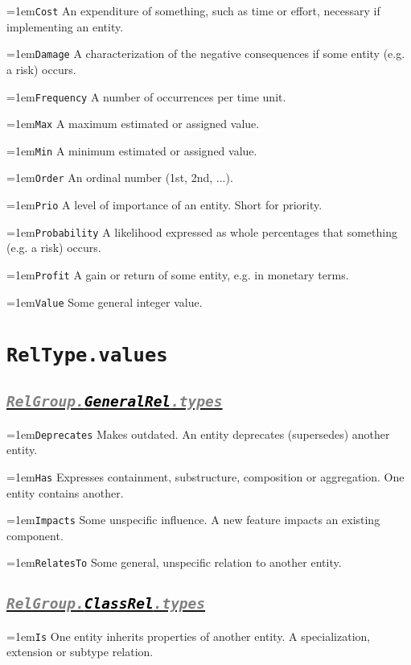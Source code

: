 \documentclass[a4paper,oneside]{article}
\newcommand\Concept[2]{\hangindent=1em\lstinline+#1+ #2}
\begin{document}
\begin{multicols*}{4}
\Concept{Cost}{An expenditure of something, such as time or effort, necessary if implementing an entity.}

\Concept{Damage}{A characterization of the negative consequences if some entity (e.g. a risk) occurs.}

\Concept{Frequency}{A number of occurrences per time unit. }

\Concept{Max}{A maximum estimated or assigned value.}

\Concept{Min}{A minimum estimated or assigned value.}

\Concept{Order}{An ordinal number (1st, 2nd, ...).}

\Concept{Prio}{A level of importance of an entity. Short for priority.}

\Concept{Probability}{A likelihood expressed as whole percentages that something (e.g. a risk) occurs.}

\Concept{Profit}{A gain or return of some entity, e.g. in monetary terms.}

\Concept{Value}{Some general integer value.}
 

\section*{\texttt{RelType.values}}

\subsection*{\underline{\texttt{\textit{{\textcolor{gray}{RelGroup.}\textcolor{black}{GeneralRel}}\textcolor{gray}{.types}}}}}
\Concept{Deprecates}{Makes outdated. An entity deprecates (supersedes) another entity.}

\Concept{Has}{Expresses containment, substructure, composition or aggregation. One entity contains another.}

\Concept{Impacts}{Some unspecific influence. A new feature impacts an existing component.}

\Concept{RelatesTo}{Some general, unspecific relation to another entity.}


\subsection*{\underline{\texttt{\textit{{\textcolor{gray}{RelGroup.}\textcolor{black}{ClassRel}}\textcolor{gray}{.types}}}}}
\Concept{Is}{One entity inherits properties of another entity. A specialization, extension or subtype relation. }



\end{multicols*}
\end{document}
